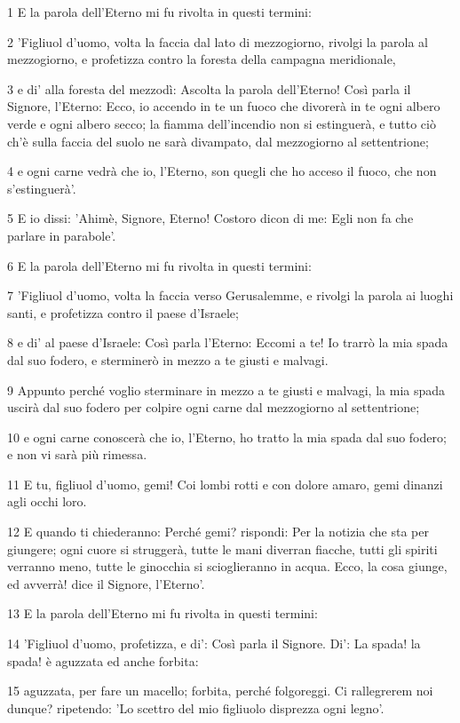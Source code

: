 \par 1 E la parola dell'Eterno mi fu rivolta in questi termini:
\par 2 'Figliuol d'uomo, volta la faccia dal lato di mezzogiorno, rivolgi la parola al mezzogiorno, e profetizza contro la foresta della campagna meridionale,
\par 3 e di' alla foresta del mezzodì: Ascolta la parola dell'Eterno! Così parla il Signore, l'Eterno: Ecco, io accendo in te un fuoco che divorerà in te ogni albero verde e ogni albero secco; la fiamma dell'incendio non si estinguerà, e tutto ciò ch'è sulla faccia del suolo ne sarà divampato, dal mezzogiorno al settentrione;
\par 4 e ogni carne vedrà che io, l'Eterno, son quegli che ho acceso il fuoco, che non s'estinguerà'.
\par 5 E io dissi: 'Ahimè, Signore, Eterno! Costoro dicon di me: Egli non fa che parlare in parabole'.
\par 6 E la parola dell'Eterno mi fu rivolta in questi termini:
\par 7 'Figliuol d'uomo, volta la faccia verso Gerusalemme, e rivolgi la parola ai luoghi santi, e profetizza contro il paese d'Israele;
\par 8 e di' al paese d'Israele: Così parla l'Eterno: Eccomi a te! Io trarrò la mia spada dal suo fodero, e sterminerò in mezzo a te giusti e malvagi.
\par 9 Appunto perché voglio sterminare in mezzo a te giusti e malvagi, la mia spada uscirà dal suo fodero per colpire ogni carne dal mezzogiorno al settentrione;
\par 10 e ogni carne conoscerà che io, l'Eterno, ho tratto la mia spada dal suo fodero; e non vi sarà più rimessa.
\par 11 E tu, figliuol d'uomo, gemi! Coi lombi rotti e con dolore amaro, gemi dinanzi agli occhi loro.
\par 12 E quando ti chiederanno: Perché gemi? rispondi: Per la notizia che sta per giungere; ogni cuore si struggerà, tutte le mani diverran fiacche, tutti gli spiriti verranno meno, tutte le ginocchia si scioglieranno in acqua. Ecco, la cosa giunge, ed avverrà! dice il Signore, l'Eterno'.
\par 13 E la parola dell'Eterno mi fu rivolta in questi termini:
\par 14 'Figliuol d'uomo, profetizza, e di': Così parla il Signore. Di': La spada! la spada! è aguzzata ed anche forbita:
\par 15 aguzzata, per fare un macello; forbita, perché folgoreggi. Ci rallegrerem noi dunque? ripetendo: 'Lo scettro del mio figliuolo disprezza ogni legno'.
